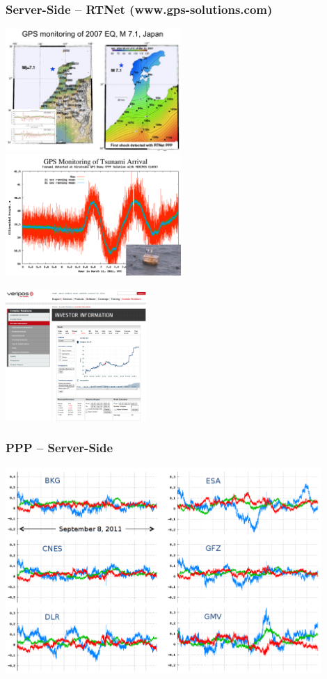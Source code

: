 \documentclass[10pt]{beamer}
\begin{document}
\begin{frame}
\frametitle{Server-Side -- RTNet (www.gps-solutions.com)}
\includegraphics[width=0.5\textwidth,angle=0]{eq_monitoring.png}
\includegraphics[width=0.5\textwidth,angle=0]{tsunami.png}
\begin{center}
\includegraphics[width=0.4\textwidth,angle=0]{veripos.png}
\end{center}
\end{frame}


\begin{frame}
\frametitle{PPP -- Server-Side}
  \begin{center}
    \includegraphics[width=0.9\textwidth,angle=0]{ac_results.png}
  \end{center}
\end{frame}
\end{document}
